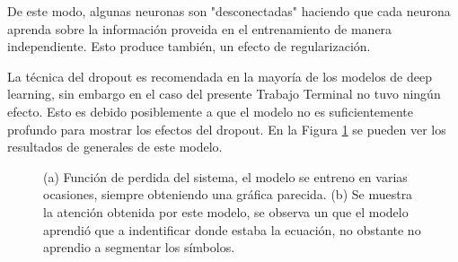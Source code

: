 De este modo, algunas neuronas son "desconectadas" haciendo que cada neurona aprenda sobre la información proveida en el entrenamiento de manera independiente. Esto produce también, un efecto de regularización.

La técnica del dropout es recomendada en la mayoría de los modelos de deep learning, sin embargo en el caso del presente Trabajo Terminal no tuvo ningún efecto. Esto es debido posiblemente a que el modelo no es suficientemente profundo para mostrar los efectos del dropout. En la Figura \ref{fig:dropout-bad} se pueden ver los resultados de generales de este modelo.



\begin{figure}[H]
    \centering
    \caption{(a) Función de perdida del sistema, el modelo se entreno en varias ocasiones, siempre obteniendo una gráfica parecida. (b) Se muestra la atención obtenida por este modelo, se observa un que el modelo aprendió que a indentificar donde estaba la ecuación, no obstante no aprendio a segmentar los símbolos.}
    \label{fig:dropout-bad}
\end{figure}
 







